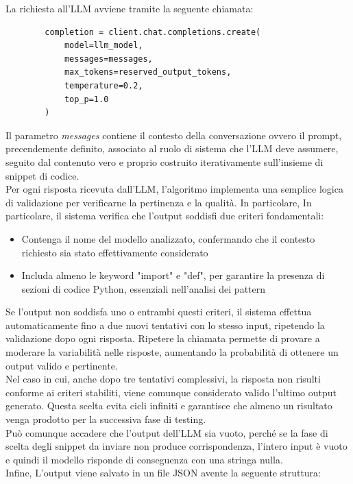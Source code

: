 \documentclass{article}
\begin{document}
La richiesta all'LLM avviene tramite la seguente chiamata:
\begin{lstlisting}
        completion = client.chat.completions.create(
            model=llm_model,
            messages=messages,
            max_tokens=reserved_output_tokens,
            temperature=0.2, 
            top_p=1.0
        )
\end{lstlisting}
Il parametro \textit{messages} contiene il contesto della conversazione ovvero il prompt, precendemente definito, associato al ruolo di sistema che l'LLM deve assumere, seguito dal contenuto vero e proprio costruito iterativamente sull'insieme di snippet di codice.\\
Per ogni risposta ricevuta dall'LLM, l'algoritmo implementa una semplice logica di validazione per verificarne la pertinenza e la qualità. In particolare, In particolare, il sistema verifica che l'output soddisfi due criteri fondamentali:
\begin{itemize}
    \item Contenga il nome del modello analizzato, confermando che il contesto richiesto sia stato effettivamente considerato
    \item Includa almeno le keyword "import" e "def", per garantire la presenza di sezioni di codice Python, essenziali nell'analisi dei pattern
\end{itemize}
Se l'output non soddisfa uno o entrambi questi criteri, il sistema effettua automaticamente fino a due nuovi tentativi con lo stesso input, ripetendo la validazione dopo ogni risposta. Ripetere la chiamata permette di provare a moderare la variabilità nelle risposte, aumentando la probabilità di ottenere un output valido e pertinente.\\ 
Nel caso in cui, anche dopo tre tentativi complessivi, la risposta non risulti conforme ai criteri stabiliti, viene comunque considerato valido l'ultimo output generato. Questa scelta evita cicli infiniti e garantisce che almeno un risultato venga prodotto per la successiva fase di testing. \\
Può comunque accadere che l'output dell'LLM sia vuoto, perché se la fase di scelta degli snippet da inviare non produce corrispondenza, l'intero input è vuoto e quindi il modello risponde di conseguenza con una stringa nulla.\\
Infine, L’output viene salvato in un file JSON avente la seguente struttura: 
\end{document}
